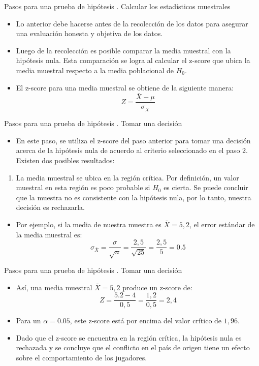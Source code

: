 \documentclass{beamer}
\newcounter{saveenumi}
\newcommand{\seti}{\setcounter{saveenumi}{\value{enumi}}}
\begin{document}
\begin{frame}{Pasos para una prueba de hipótesis}
	{. Calcular los estadísticos muestrales}
	\begin{itemize}
		\justifying
\item Lo anterior debe hacerse antes de la recolección de los datos para asegurar una evaluación honesta y objetiva de los datos.
\item Luego de la recolección es posible comparar la media muestral con la hipótesis nula. Esta comparación se logra al calcular el z-score que ubica la media muestral respecto a la media poblacional de $H_0$.
\item El z-score para una media muestral se obtiene de la siguiente manera:
$$Z=\dfrac{\bar{X}-\mu}{\sigma_{\bar{X}}}$$
	\end{itemize}
\end{frame}

\begin{frame}{Pasos para una prueba de hipótesis}
	{. Tomar una decisión}
	\begin{itemize}
\justifying
\item En este paso, se utiliza el z-score del paso anterior para tomar una decisión acerca de la hipótesis nula de acuerdo al criterio seleccionado en el paso 2. Existen dos posibles resultados:

	\end{itemize}
	\begin{enumerate}
		\item La media muestral se ubica en la región crítica. Por definición, un valor muestral en esta región es poco probable si $H_0$ es cierta. Se puede concluir que la muestra no es consistente con la hipótesis nula, por lo tanto, nuestra decisión es rechazarla. 
		\seti
	\end{enumerate}
	\begin{itemize}
\justifying
\item Por ejemplo, si la media de nuestra muestra es $\bar{X}=5,2$, el error estándar de la media muestral es:
$$\sigma_{\bar{X}}=\dfrac{\sigma}{\sqrt{n}}=\dfrac{2,5}{\sqrt{25}}=\dfrac{2,5}{5}=0.5$$
	\end{itemize}
\end{frame}

\begin{frame}{Pasos para una prueba de hipótesis}
	{. Tomar una decisión}
\begin{itemize}
\justifying
\item Así, una media muestral $\bar{X}=5,2$ produce un z-score de:
$$Z=\dfrac{5.2-4}{0,5}=\dfrac{1,2}{0,5}=2,4$$
\item Para un $\alpha=0.05$, este z-score está por encima del valor crítico de $1,96$.
\item Dado que el z-score se encuentra en la región crítica, la hipótesis nula es rechazada y se concluye que el conflicto en el país de origen tiene un efecto sobre el comportamiento de los jugadores.
\end{itemize}
\end{frame}
\end{document}
